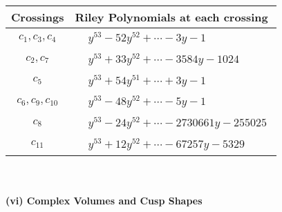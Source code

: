 \documentclass[1p]{elsarticle_modified}
\theoremstyle{definition}
\begin{document}
\begin{tabular}{m{50pt}|m{274pt}}
Crossings & \hspace{64pt}Riley Polynomials at each crossing \\
\hline $$\begin{aligned}c_{1},c_{3},c_{4}\end{aligned}$$&$\begin{aligned}
&y^{53}-52 y^{52}+\cdots-3 y-1
\end{aligned}$\\
\hline $$\begin{aligned}c_{2},c_{7}\end{aligned}$$&$\begin{aligned}
&y^{53}+33 y^{52}+\cdots-3584 y-1024
\end{aligned}$\\
\hline $$\begin{aligned}c_{5}\end{aligned}$$&$\begin{aligned}
&y^{53}+54 y^{51}+\cdots+3 y-1
\end{aligned}$\\
\hline $$\begin{aligned}c_{6},c_{9},c_{10}\end{aligned}$$&$\begin{aligned}
&y^{53}-48 y^{52}+\cdots-5 y-1
\end{aligned}$\\
\hline $$\begin{aligned}c_{8}\end{aligned}$$&$\begin{aligned}
&y^{53}-24 y^{52}+\cdots-2730661 y-255025
\end{aligned}$\\
\hline $$\begin{aligned}c_{11}\end{aligned}$$&$\begin{aligned}
&y^{53}+12 y^{52}+\cdots-67257 y-5329
\end{aligned}$\\
\hline
\end{tabular}\\~\\
\newpage\flushleft \textbf{(vi) Complex Volumes and Cusp Shapes}
\end{document}
